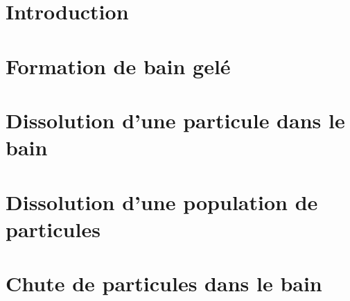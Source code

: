\section{Introduction}
\label{sec:particle-introduction}


\section{Formation de bain gelé}
\label{sec:particle-freeze}


\section{Dissolution d'une particule dans le bain}
\label{sec-particle-dissolution}


\section{Dissolution d'une population de particules}
\label{sec:particle-population-dissolution}


\section{Chute de particules dans le bain}
\label{sec:particle-fall}


